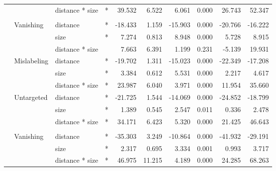 \begin{longtable}[t]{llllrrrrrr}
\cmidrule{3-10}\nopagebreak
\hspace{1em} &  & distance * size & * & 39.532 & 6.522 & 6.061 & 0.000 & 26.743 & 52.347\\
\cmidrule{1-10}\pagebreak[0]
\addlinespace[0.3em]
\multicolumn{10}{l}{\textbf{SSD}}\\
\hspace{1em} & Vanishing & distance & * & -18.433 & 1.159 & -15.903 & 0.000 & -20.766 & -16.222\\
\cmidrule{3-10}\nopagebreak
\hspace{1em} &  & size & * & 7.274 & 0.813 & 8.948 & 0.000 & 5.728 & 8.915\\
\cmidrule{3-10}\nopagebreak
\hspace{1em} &  & distance * size &  & 7.663 & 6.391 & 1.199 & 0.231 & -5.139 & 19.931\\
\cmidrule{2-10}\nopagebreak
\hspace{1em} & Mislabeling & distance & * & -19.702 & 1.311 & -15.023 & 0.000 & -22.349 & -17.208\\
\cmidrule{3-10}\nopagebreak
\hspace{1em} &  & size & * & 3.384 & 0.612 & 5.531 & 0.000 & 2.217 & 4.617\\
\cmidrule{3-10}\nopagebreak
\hspace{1em} &  & distance * size & * & 23.987 & 6.040 & 3.971 & 0.000 & 11.954 & 35.660\\
\cmidrule{2-10}\nopagebreak
\hspace{1em} & Untargeted & distance & * & -21.725 & 1.544 & -14.069 & 0.000 & -24.852 & -18.799\\
\cmidrule{3-10}\nopagebreak
\hspace{1em} &  & size & * & 1.389 & 0.545 & 2.547 & 0.011 & 0.336 & 2.478\\
\cmidrule{3-10}\nopagebreak
\hspace{1em} &  & distance * size & * & 34.171 & 6.423 & 5.320 & 0.000 & 21.425 & 46.643\\
\cmidrule{1-10}\pagebreak[0]
\addlinespace[0.3em]
\multicolumn{10}{l}{\textbf{RetinaNet}}\\
\hspace{1em} & Vanishing & distance & * & -35.303 & 3.249 & -10.864 & 0.000 & -41.932 & -29.191\\
\cmidrule{3-10}\nopagebreak
\hspace{1em} &  & size & * & 2.317 & 0.695 & 3.334 & 0.001 & 0.993 & 3.717\\
\cmidrule{3-10}\nopagebreak
\hspace{1em} &  & distance * size & * & 46.975 & 11.215 & 4.189 & 0.000 & 24.285 & 68.263\\

\end{longtable}
